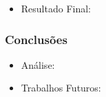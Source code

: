\documentclass[brazil]{beamer}
\begin{document}
\begin{frame}
  \begin{itemize}
      \item Resultado Final:
              
  \end{itemize} 
\end{frame}


\begin{frame}
\frametitle{Conclusões}
  \begin{itemize}
      \item Análise:
      
      \item Trabalhos Futuros:
              
  \end{itemize} 
\end{frame}
\end{document}
